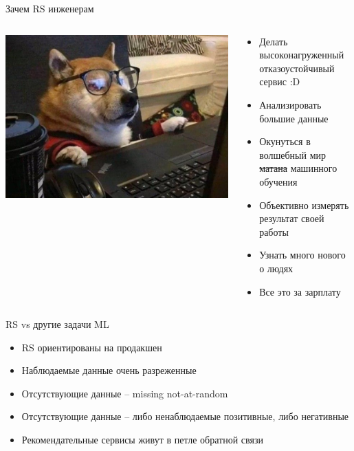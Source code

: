 \documentclass[11pt,aspectratio=169,handout=true]{beamer}
\begin{document}
\begin{frame}{Зачем RS инженерам}

\begin{columns}
\begin{column}{0.4\textwidth}
   \begin{center}
                \includegraphics[scale=0.25]{images/computerdog.jpeg}
   \end{center}
\end{column}
\begin{column}{0.5\textwidth}
    \begin{small}
    \begin{itemize}
    \item Делать высоконагруженный отказоустойчивый сервис :D
    \item Анализировать большие данные
    \item Окунуться в волшебный мир \sout{матана} машинного обучения
    \item Объективно измерять результат своей работы 
    \item Узнать много нового о людях
    \item Все это за зарплату
    \end{itemize}
    \end{small}
\end{column}
\end{columns}

\end{frame}

\begin{frame}{RS vs другие задачи ML \cite{NETFLIX}}

\begin{itemize}[<+->]
\item RS ориентированы на продакшен
\item Наблюдаемые данные очень разреженные
\item Отсутствующие данные -- missing not-at-random
\item Отсутствующие данные -- либо ненаблюдаемые позитивные, либо негативные
\item Рекомендательные сервисы живут в петле обратной связи
\end{itemize}

\end{frame}
\end{document}
